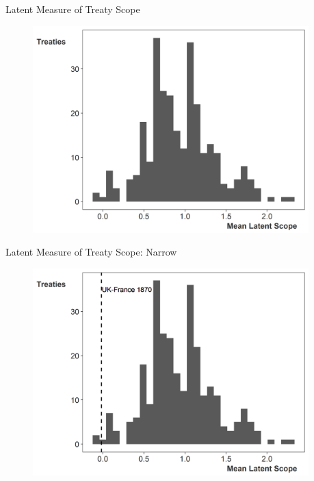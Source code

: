 \documentclass{beamer}
\begin{document}

\begin{frame}{Latent Measure of Treaty Scope}

\begin{figure}[htbp]
	\centering
		\includegraphics[width=0.95\textwidth]{ls-hist.png}
\end{figure}


\end{frame} 


\begin{frame}{Latent Measure of Treaty Scope: Narrow}

\begin{figure}[htbp]
	\centering
		\includegraphics[width=0.95\textwidth]{ls-hist-narrow.png}
\end{figure}


\end{frame} 
\end{document}
